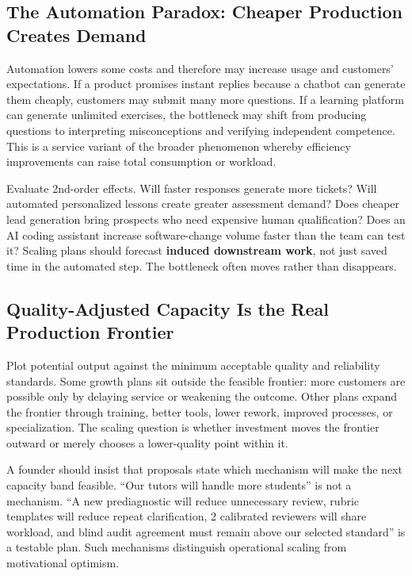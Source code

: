 \subsection{The Automation Paradox: Cheaper Production Creates Demand}
\label{sec:automation_paradox_creates_demand}

Automation lowers some costs and therefore may increase usage and customers' expectations. If a product promises instant replies because a chatbot can generate them cheaply, customers may submit many more questions. If a learning platform can generate unlimited exercises, the bottleneck may shift from producing questions to interpreting misconceptions and verifying independent competence. This is a service variant of the broader phenomenon whereby efficiency improvements can raise total consumption or workload.

Evaluate 2nd-order effects. Will faster responses generate more tickets? Will automated personalized lessons create greater assessment demand? Does cheaper lead generation bring prospects who need expensive human qualification? Does an AI coding assistant increase software-change volume faster than the team can test it? Scaling plans should forecast \textbf{induced downstream work}, not just saved time in the automated step. The bottleneck often moves rather than disappears.

\subsection{Quality-Adjusted Capacity Is the Real Production Frontier}
\label{sec:quality_adjusted_production_frontier}

Plot potential output against the minimum acceptable quality and reliability standards. Some growth plans sit outside the feasible frontier: more customers are possible only by delaying service or weakening the outcome. Other plans expand the frontier through training, better tools, lower rework, improved processes, or specialization. The scaling question is whether investment moves the frontier outward or merely chooses a lower-quality point within it.

A founder should insist that proposals state which mechanism will make the next capacity band feasible. ``Our tutors will handle more students'' is not a mechanism. ``A new prediagnostic will reduce unnecessary review, rubric templates will reduce repeat clarification, 2 calibrated reviewers will share workload, and blind audit agreement must remain above our selected standard'' is a testable plan. Such mechanisms distinguish operational scaling from motivational optimism.
